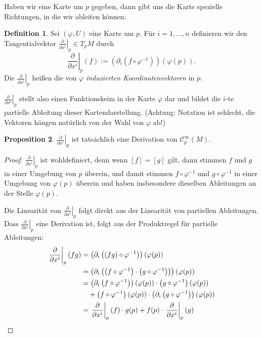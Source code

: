 \documentclass[a4paper]{scrreprt}
\numberwithin{equation}{chapter}
\newcommand{\sC}{\mathcal{C}^{\infty}}
\theoremstyle{definition}
\newtheorem{defn}{Definition}[section]
\newtheorem{prop}[defn]{Proposition}
\begin{document}
Haben wir eine Karte um $p$ gegeben, dann gibt uns die Karte spezielle \glqq Richtungen, in die wir ableiten können\grqq:
\begin{defn}
	Sei $(\varphi,U)$ eine Karte um $p$. Für $i = 1,\dots, n$ definieren wir den Tangentialvektor $\left.\frac{\partial}{\partial x^i}\right|_p \in T_pM$ durch
	\[\left.\frac{\partial}{\partial x^i}\right|_p(f) := \left(\partial_i \left(f\circ \varphi^{-1}\right)\right) (\varphi(p)).\]
	Die $\left.\frac{\partial}{\partial x^i}\right|_p$ heißen die von $\varphi$ \emph{induzierten Koordinatenvektoren} in $p$.
\end{defn}
$\left.\frac{\partial}{\partial x^i}\right|_p$ stellt also einen Funktionskeim in der Karte $\varphi$ dar und bildet die $i$-te partielle Ableitung dieser Kartendarstellung. (Achtung: Notation ist schlecht, die Vektoren hängen natürlich von der Wahl von $\varphi$ ab!)
\begin{prop}
	$\left.\frac{\partial}{\partial x^i}\right|_p$ ist tatsächlich eine Derivation von $\sC_p(M)$.

	\begin{proof}
		$\left.\frac{\partial}{\partial x^i}\right|_p$ ist wohldefiniert, denn wenn $[f] = [g]$ gilt, dann stimmen $f$ und $g$ in einer Umgebung von $p$ überein, und damit stimmen $f\circ \varphi^{-1}$ und $g\circ \varphi^{-1}$ in einer Umgebung von $\varphi(p)$ überein und haben insbesondere dieselben Ableitungen an der Stelle $\varphi(p)$.

		Die Linearität von $\left.\frac{\partial}{\partial x^i}\right|_p$ folgt direkt aus der Linearität von partiellen Ableitungen. Dass $\left.\frac{\partial}{\partial x^i}\right|_p$ eine Derivation ist, folgt aus der Produktregel für partielle Ableitungen:
		\begin{align*}
			\left.\frac{\partial}{\partial x^i}\right|_p (fg) &= \left(\partial_i \left((fg)\circ \varphi^{-1}\right)\right) (\varphi(p))\\
			&= \left(\partial_i \left( \left(f\circ \varphi^{-1}\right) \cdot \left(g\circ \varphi^{-1}\right) \right) \right) (\varphi(p))\\
			&= \left(\partial_i \left(f\circ \varphi^{-1}\right) \right)(\varphi(p)) \cdot \left(g\circ \varphi^{-1}\right) (\varphi(p)) \\&\quad+ \left(f\circ \varphi^{-1}\right) (\varphi(p)) \cdot \left(\partial_i \left(g\circ \varphi^{-1}\right) \right)(\varphi(p))\\
			&= \left.\frac{\partial}{\partial x^i}\right|_p (f) \cdot g(p) + f(p) \cdot \left.\frac{\partial}{\partial x^i}\right|_p (g) \qedhere
		\end{align*}
	\end{proof}
\end{prop}
\end{document}
